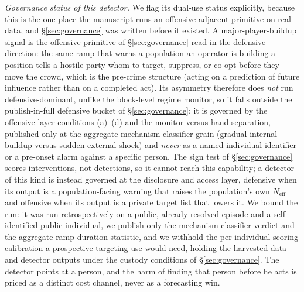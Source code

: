 \documentclass[11pt]{article}
\begin{document}
\emph{Governance status of this detector.} We flag its dual-use status explicitly, because this is the one place the manuscript runs an offensive-adjacent primitive on real data, and \S\ref{sec:governance} was written before it existed. A major-player-buildup signal is the offensive primitive of \S\ref{sec:governance} read in the defensive direction: the same ramp that warns a population an operator is building a position tells a hostile party whom to target, suppress, or co-opt before they move the crowd, which is the pre-crime structure (acting on a prediction of future influence rather than on a completed act). Its asymmetry therefore does \emph{not} run defensive-dominant, unlike the block-level regime monitor, so it falls outside the publish-in-full defensive bucket of \S\ref{sec:governance}: it is governed by the offensive-layer conditions (a)--(d) and the monitor-versus-hand separation, published only at the aggregate mechanism-classifier grain (gradual-internal-buildup versus sudden-external-shock) and \emph{never} as a named-individual identifier or a pre-onset alarm against a specific person. The sign test of \S\ref{sec:governance} scores interventions, not detections, so it cannot reach this capability; a detector of this kind is instead governed at the disclosure and access layer, defensive when its output is a population-facing warning that raises the population's own $N_{\mathrm{eff}}$ and offensive when its output is a private target list that lowers it. We bound the run: it was run retrospectively on a public, already-resolved episode and a self-identified public individual, we publish only the mechanism-classifier verdict and the aggregate ramp-duration statistic, and we withhold the per-individual scoring calibration a prospective targeting use would need, holding the harvested data and detector outputs under the custody conditions of \S\ref{sec:governance}. The detector points at a person, and the harm of finding that person before he acts is priced as a distinct cost channel, never as a forecasting win.
\end{document}
